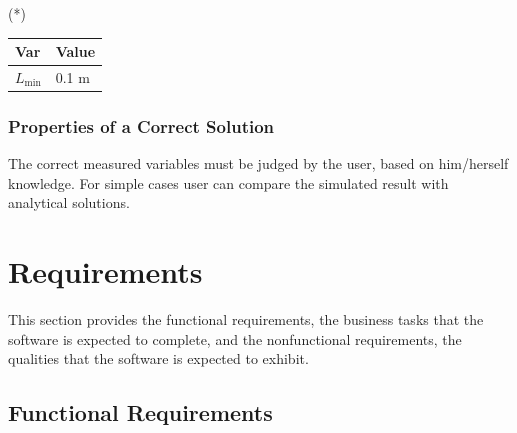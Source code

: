 \documentclass[12pt]{article}
\begin{document}
\noindent 
\begin{description}
\item[(*)] 
\end{description}

\begin{table}[!h]
\caption{Specification Parameter Values} \label{TblSpecParams}
\renewcommand{\arraystretch}{1.2}
\noindent \begin{longtable*}{l l} 
  \toprule
  \textbf{Var} & \textbf{Value} \\
  \midrule 
  $L_\text{min}$ & 0.1 \si{\metre}\\
  \bottomrule
\end{longtable*}
\end{table}

\subsubsection{Properties of a Correct Solution} \label{sec_CorrectSolution}

The correct measured variables must be judged by the user, based on him/herself knowledge. For simple cases user can compare the simulated result with analytical solutions.



\section{Requirements}


This section provides the functional requirements, the business tasks that the
software is expected to complete, and the nonfunctional requirements, the
qualities that the software is expected to exhibit.

\subsection{Functional Requirements}
\end{document}
